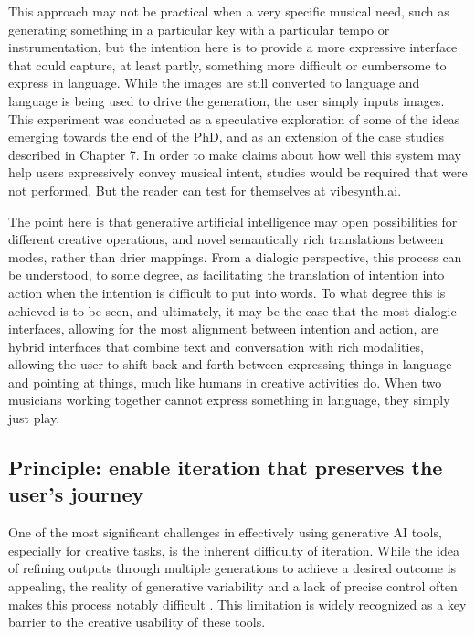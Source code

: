 This approach may not be practical when a very specific musical need, such as generating something in a particular key with a particular tempo or instrumentation, but the intention here is to provide a more expressive interface that could capture, at least partly, something more difficult or cumbersome to express in language. While the images are still converted to language and language is being used to drive the generation, the user simply inputs images. This experiment was conducted as a speculative exploration of some of the ideas emerging towards the end of the PhD, and as an extension of the case studies described in Chapter 7. In order to make claims about how well this system may help users expressively convey musical intent, studies would be required that were not performed. But the reader can test for themselves at vibesynth.ai.

The point here is that generative artificial intelligence may open possibilities for different creative operations, and novel semantically rich translations between modes, rather than drier mappings. From a dialogic perspective, this process can be understood, to some degree, as facilitating the translation of intention into action when the intention is difficult to put into words. To what degree this is achieved is to be seen, and ultimately, it may be the case that the most dialogic interfaces, allowing for the most alignment between intention and action, are hybrid interfaces that combine text and conversation with rich modalities, allowing the user to shift back and forth between expressing things in language and pointing at things, much like humans in creative activities do. When two musicians working together cannot express something in language, they simply just play.

\subsection{Principle: enable iteration that preserves the user's journey}

One of the most significant challenges in effectively using generative AI tools, especially for creative tasks, is the inherent difficulty of iteration. While the idea of refining outputs through multiple generations to achieve a desired outcome is appealing, the reality of generative variability and a lack of precise control often makes this process notably difficult \cite{Park2024-gw}. This limitation is widely recognized as a key barrier to the creative usability of these tools.

